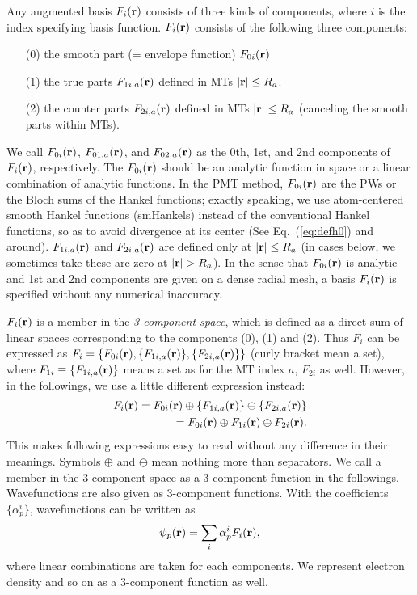 \documentclass[a4paper,10pt,aip,onecolumn,amsmath,amssymb,floatfix,rmp]{revtex4-1}
\newcommand{\bfr}{{\bf r}}
\newcommand{\ooplus}{\oplus}
\newcommand{\oominus}{\ominus}
\newcommand{\req}[1]{\mbox{Eq.~\!(\ref{#1})}}
\def\smhs{smHankels}
\begin{document}
Any augmented basis $F_{i}(\bfr)$ consists of three kinds of components, 
where $i$ is the index specifying basis function. $F_{i}(\bfr)$
consists of the following three components:
\begin{itemize}
\item[(0)] 
the smooth part (= envelope function) $F_{0i}(\bfr)$
\item[(1)]
the true parts $F_{1i,a}(\bfr)$ defined in MTs $|\bfr| \leq R_a$.
\item[(2)]
the counter parts $F_{2i,a}(\bfr)$ defined in MTs $|\bfr| \leq R_a$ 
(canceling the smooth parts within MTs).
\end{itemize}
We call $F_{0i}(\bfr)$, $F_{01,a}(\bfr)$, and $F_{02,a}(\bfr)$ as the
0th, 1st, and 2nd components of $F_{i}(\bfr)$, respectively.
The $F_{0i}(\bfr)$ should be an analytic function in space or a linear
combination of analytic functions.
In the PMT method, $F_{0i}(\bfr)$ are the PWs or the Bloch sums of the
Hankel functions; exactly speaking, we use atom-centered 
smooth Hankel functions (\smhs) instead of the conventional Hankel functions, 
so as to avoid divergence at its center 
\cite{lmfchap,Bott98} (See \req{eq:defh0} and around). 
$F_{1i,a}(\bfr)$ and $F_{2i,a}(\bfr)$ are defined only at
$|\bfr| \leq R_a$ (in cases below, we sometimes take these are zero at $|\bfr|>R_a$).
In the sense that $F_{0i}(\bfr)$ is analytic and 1st and 2nd components 
are given on a dense radial mesh, a basis $F_{i}(\bfr)$ is specified
without any numerical inaccuracy.

$F_{i}(\bfr)$ is a member in the {\it 3-component space}, which
is defined as a direct sum of linear spaces
corresponding to the components (0), (1) and (2). Thus $F_i$ can be expressed as
$F_i=\{F_{0i}(\bfr),\{F_{1i,a}(\bfr)\},\{F_{2i,a}(\bfr)\} \}$
(curly bracket mean a set), where $F_{1i}\equiv \{F_{1i,a}(\bfr)\}$
means a set as for the MT index $a$, $F_{2i}$ as well. However, in the followings, we use a
little different expression instead:
\begin{eqnarray}
F_i(\bfr) = F_{0i}(\bfr) \ooplus \{ F_{1i,a}(\bfr)\} \oominus \{F_{2i,a}(\bfr)\}\nonumber\\
= F_{0i}(\bfr) \ooplus F_{1i}(\bfr)\oominus F_{2i}(\bfr).
\label{eq:basis}
\end{eqnarray}
This makes following expressions easy to read without any difference
in their meanings. Symbols $\ooplus$ and $\oominus$ mean nothing more
than separators.
We call a member in the 3-component space as a 3-component function in
the followings.
Wavefunctions are also given as 3-component functions.
With the coefficients $\{\alpha_{p}^i\}$, wavefunctions can be written as
\begin{eqnarray}
\psi_p(\bfr) = \sum_i \alpha_p^i F_i(\bfr),
\label{eq:eig}
\end{eqnarray}
where linear combinations are taken for each components.
We represent electron density and so on as a 3-component function as well.
\end{document}
